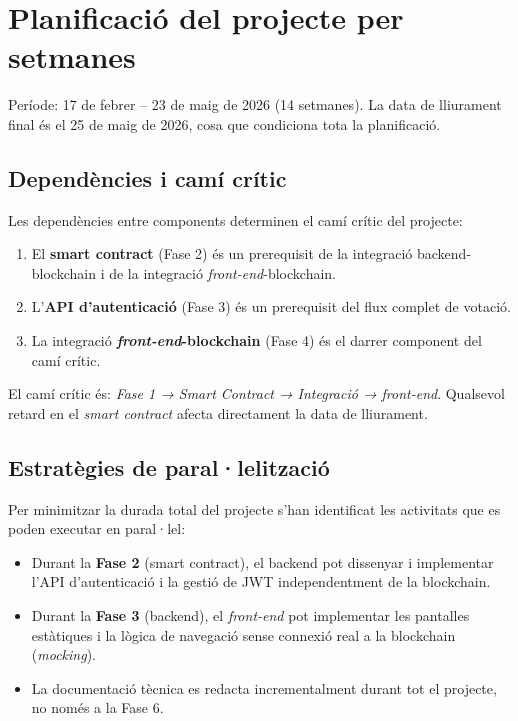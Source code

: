 \documentclass[12pt,a4paper,catalan]{article}
\begin{document}
\section{Planificació del projecte per setmanes}

Període: 17 de febrer -- 23 de maig de 2026 (14 setmanes). La data de lliurament final és el 25 de maig de 2026, cosa que condiciona tota la planificació.

\subsection{Dependències i camí crític}

Les dependències entre components determinen el camí crític del projecte:

\begin{enumerate}
    \item El \textbf{smart contract} (Fase 2) és un prerequisit de la integració backend-blockchain i de la integració \textit{front-end}-blockchain.
    \item L'\textbf{API d'autenticació} (Fase 3) és un prerequisit del flux complet de votació.
    \item La integració \textbf{\textit{front-end}-blockchain} (Fase 4) és el darrer component del camí crític.
\end{enumerate}

El camí crític és: \textit{Fase 1 → Smart Contract → Integració → \textit{front-end}}. Qualsevol retard en el \textit{smart contract} afecta directament la data de lliurament.

\subsection{Estratègies de paral·lelització}

Per minimitzar la durada total del projecte s'han identificat les activitats que es poden executar en paral·lel:

\begin{itemize}
    \item Durant la \textbf{Fase 2} (smart contract), el backend pot dissenyar i implementar l'API d'autenticació i la gestió de JWT independentment de la blockchain.
    \item Durant la \textbf{Fase 3} (backend), el \textit{front-end} pot implementar les pantalles estàtiques i la lògica de navegació sense connexió real a la blockchain (\textit{mocking}).
    \item La documentació tècnica es redacta incrementalment durant tot el projecte, no només a la Fase 6.
\end{itemize}
\end{document}
